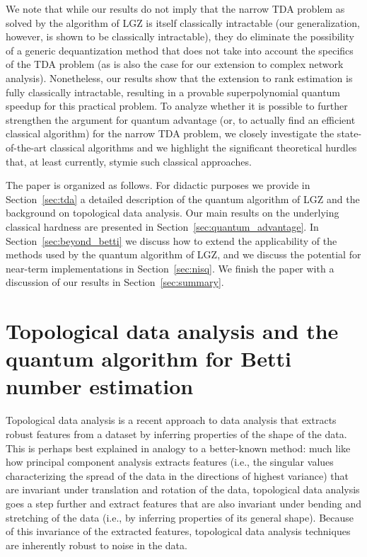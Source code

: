 \documentclass[a4paper, onecolumn, accepted=2022-08-28]{quantumarticle}
\begin{document}
We note that while our results do not imply that the narrow TDA problem as solved by the algorithm of LGZ is itself classically intractable (our generalization, however, is shown to be classically intractable), they do eliminate the possibility of a generic dequantization method that does not take into account the specifics of the TDA problem (as is also the case for our extension to complex network analysis).
Nonetheless, our results show that the extension to rank estimation is fully classically intractable, resulting in a provable superpolynomial quantum speedup for this practical problem.
To analyze whether it is possible to further strengthen the argument for quantum advantage (or, to actually find an efficient classical algorithm) for the narrow TDA problem, we closely investigate the state-of-the-art classical algorithms and we highlight the significant theoretical hurdles that, at least currently, stymie such classical approaches.

\medskip

The paper is organized as follows.
For didactic purposes we provide in Section~\ref{sec:tda} a detailed description of the quantum algorithm of LGZ and the background on topological data analysis.
Our main results on the underlying classical hardness are presented in Section~\ref{sec:quantum_advantage}.
In Section~\ref{sec:beyond_betti} we discuss how to extend the applicability of the methods used by the quantum algorithm of LGZ, and we discuss the potential for near-term implementations in Section~\ref{sec:nisq}.
We finish the paper with a discussion of our results in Section~\ref{sec:summary}.

\section{Topological data analysis and the quantum algorithm for Betti number estimation
  \label{sec:tda}}

Topological data analysis is a recent approach to data analysis that extracts robust features from a dataset by inferring properties of the shape of the data.
This is perhaps best explained in analogy to a better-known method: much like how principal component analysis extracts features (i.e., the singular values characterizing the spread of the data in the directions of highest variance) that are invariant under translation and rotation of the data, topological data analysis goes a step further and extract features that are also invariant under bending and stretching of the data (i.e., by inferring properties of its general shape).
Because of this invariance of the extracted features, topological data analysis techniques are inherently robust to noise in the data.
\end{document}
